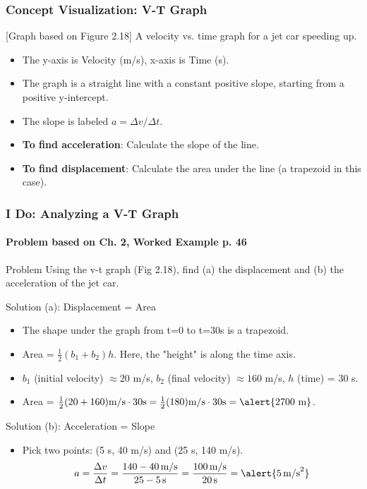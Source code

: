 \documentclass{beamer}
\begin{document}
\begin{frame}
\frametitle{Concept Visualization: V-T Graph}
\begin{alertblock}{[Graph based on Figure 2.18]}
A velocity vs. time graph for a jet car speeding up.
\begin{itemize}
    \item The y-axis is Velocity (m/s), x-axis is Time (s).
    \item The graph is a straight line with a constant positive slope, starting from a positive y-intercept.
    \item The slope is labeled $a = \Delta v / \Delta t$.
\end{itemize}
\end{alertblock}
\pause
\begin{itemize}
    \item \textbf{To find acceleration}: Calculate the \alert{slope} of the line.
    \item \textbf{To find displacement}: Calculate the \alert{area under the line} (a trapezoid in this case).
\end{itemize}
\end{frame}

\begin{frame}
\frametitle{I Do: Analyzing a V-T Graph}
\framesubtitle{Problem based on Ch. 2, Worked Example p. 46}
\begin{block}{Problem}
Using the v-t graph (Fig 2.18), find (a) the displacement and (b) the acceleration of the jet car.
\end{block}
\pause
\begin{block}{Solution (a): Displacement = Area}
\begin{itemize}
    \item The shape under the graph from t=0 to t=30s is a trapezoid.
    \item Area = $\frac{1}{2}(b_1 + b_2)h$. Here, the "height" is along the time axis.
    \item $b_1$ (initial velocity) $\approx 20$ m/s, $b_2$ (final velocity) $\approx 160$ m/s, $h$ (time) = 30 s.
    \item Area = $\frac{1}{2}(20 + 160)\text{m/s} \cdot 30\text{s} = \frac{1}{2}(180)\text{m/s} \cdot 30\text{s} = \alert{2700 \text{ m}}$.
\end{itemize}
\end{block}
\pause
\begin{block}{Solution (b): Acceleration = Slope}
\begin{itemize}
    \item Pick two points: (5 s, 40 m/s) and (25 s, 140 m/s).
    \[ a = \frac{\Delta v}{\Delta t} = \frac{140 - 40 \, \text{m/s}}{25 - 5 \, \text{s}} = \frac{100 \, \text{m/s}}{20 \, \text{s}} = \alert{5 \, \text{m/s}^2} \]
\end{itemize}
\end{block}
\end{frame}
\end{document}
